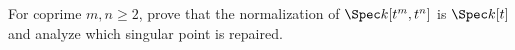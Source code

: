 \begin{problem}\label{chal:vi28-01}
For coprime $m,n\ge2$, prove that the normalization of $\Spec k[t^m,t^n]$ is $\Spec k[t]$ and analyze which singular point is repaired.
\end{problem}

